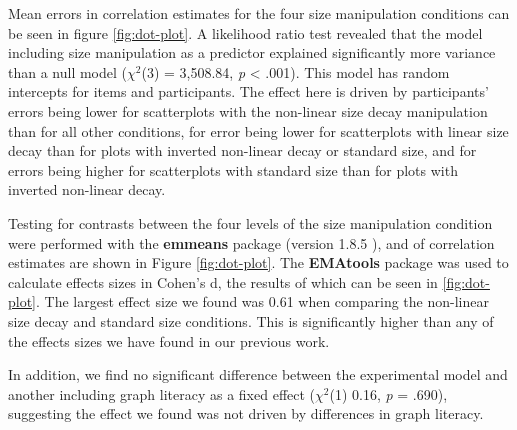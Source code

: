 \documentclass{vgtc}                          %
\begin{document}
Mean errors in correlation estimates for the four size manipulation conditions
can be seen in figure \ref{fig:dot-plot}. A likelihood ratio test revealed that the
model including size manipulation as a predictor explained significantly more
variance than a null model (\(\chi^2\)(3) = 3,508.84,
\emph{p} \textless{} .001). This model has random intercepts for
items and participants. The effect here is driven by participants' errors being lower
for scatterplots with the non-linear size decay manipulation than for all other conditions,
for error being lower for scatterplots with linear size decay than for plots with
inverted non-linear decay or standard size, and for errors being higher for scatterplots
with standard size than for plots with inverted non-linear decay.

Testing for contrasts between the four levels of the size manipulation condition
were performed with the \textbf{emmeans} package (version 1.8.5 \cite{emmeans}), and
of correlation estimates are shown in Figure \ref{fig:dot-plot}. The \textbf{EMAtools} package
was used to calculate effects sizes in Cohen's d, the results of which can be seen in
\ref{fig:dot-plot}. The largest effect size we found was 0.61 when comparing
the non-linear size decay and standard size conditions. This is significantly higher
than any of the effects sizes we have found in our previous work.

\begin{table}

\caption{\label{tab:contrasts-table}Contrasts between each of the four levels of the size decay condition.}
\centering
{}
\end{table}

In addition, we find no significant difference between the experimental model
and another including graph literacy as a fixed effect (\(\chi^2\)(1) 0.16, \emph{p} = .690), suggesting the effect
we found was not driven by differences in graph literacy.
\end{document}
